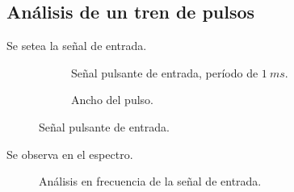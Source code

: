   \subsection{Análisis de un tren de pulsos}

    Se setea la señal de entrada.

        \begin{figure}[H]
        \centering
        \begin{subfigure}[H]{0.48\textwidth}
          \caption{Señal pulsante de entrada, período de $1~ms$.}
        \end{subfigure}
        \hfill
        \begin{subfigure}[H]{0.48\textwidth}
          \caption{Ancho del pulso.}
        \end{subfigure}

        \caption{Señal pulsante de entrada.}
        \label{fig:Exp2SeñalPulso}
      \end{figure}

    Se observa en el espectro.

      \begin{figure}[H]
        \centering
          \caption{Análisis en frecuencia de la señal de entrada.}
          \label{fig:Exp2SeñalPulsanteEspectro}
      \end{figure}


